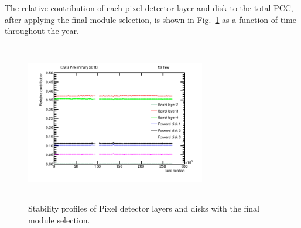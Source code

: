 The relative contribution of each pixel detector layer and disk to the total PCC, after applying the final module selection, is shown in Fig.~\ref{fig:stabprof} as a function of time throughout the year.
\begin{figure}[h]
    \centering
    \includegraphics[width=0.7\textwidth, height=7cm]{Chapter4/module_selection/ProfileX_combined_testing_LUM_20-001.png}
    \caption{Stability profiles of Pixel detector layers and disks with the final module selection.}
    \label{fig:stabprof}
\end{figure}

 



